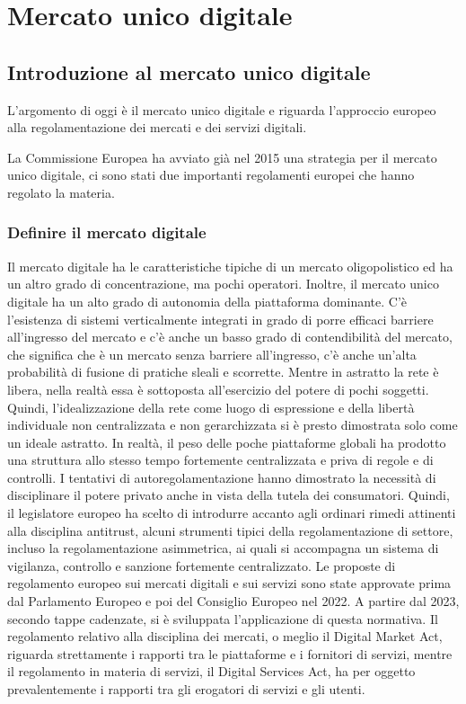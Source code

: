 \chapter{Mercato unico digitale}
\section{Introduzione al mercato unico digitale}
L'argomento di oggi è il mercato unico digitale e riguarda l'approccio europeo alla regolamentazione dei mercati e dei servizi digitali.

La Commissione Europea ha avviato già nel 2015 una strategia per il mercato unico digitale, ci sono stati due importanti regolamenti europei che hanno regolato la materia.

\subsection{Definire il mercato digitale}

Il mercato digitale ha le caratteristiche tipiche di un mercato oligopolistico ed ha un altro grado di concentrazione, ma pochi operatori.
Inoltre, il mercato unico digitale ha un alto grado di autonomia della piattaforma dominante.
C'è l'esistenza di sistemi verticalmente integrati in grado di porre efficaci barriere all'ingresso del mercato e c'è anche un basso grado di contendibilità del mercato, che significa che è un mercato senza barriere all'ingresso, c'è anche un'alta probabilità di fusione di pratiche sleali e scorrette.
Mentre in astratto la rete è libera, nella realtà essa è sottoposta all'esercizio del potere di pochi soggetti.
Quindi, l'idealizzazione della rete come luogo di espressione e della libertà individuale non centralizzata e non gerarchizzata si è presto dimostrata solo come un ideale astratto. In realtà, il peso delle poche piattaforme globali ha prodotto una struttura allo stesso tempo fortemente centralizzata e priva di regole e di controlli.
I tentativi di autoregolamentazione hanno dimostrato la necessità di disciplinare il potere privato anche in vista della tutela dei consumatori.
Quindi, il legislatore europeo ha scelto di introdurre accanto agli ordinari rimedi attinenti alla disciplina antitrust, alcuni strumenti tipici della regolamentazione di settore, incluso la regolamentazione asimmetrica, ai quali si accompagna un sistema di vigilanza, controllo e sanzione fortemente centralizzato.
Le proposte di regolamento europeo sui mercati digitali e sui servizi sono state approvate prima dal Parlamento Europeo e poi del Consiglio Europeo nel 2022.
A partire dal 2023, secondo tappe cadenzate, si è sviluppata l'applicazione di questa normativa.
Il regolamento relativo alla disciplina dei mercati, o meglio il Digital Market Act, riguarda strettamente i rapporti tra le piattaforme e i fornitori di servizi, mentre il regolamento in materia di servizi, il Digital Services Act, ha per oggetto prevalentemente i rapporti tra gli erogatori di servizi e gli utenti.

